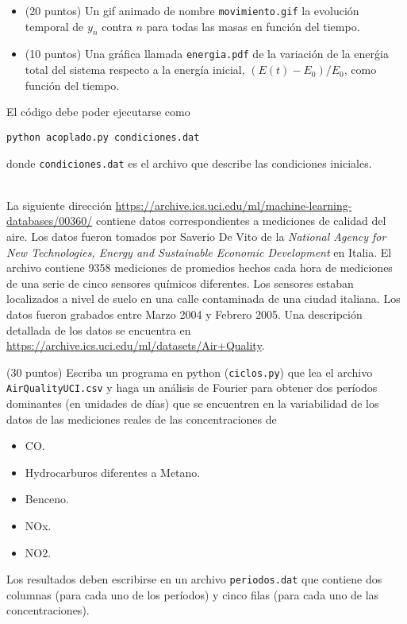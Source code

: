 \documentclass[11pt,letterpaper]{exam}
\begin{document}
\begin{questions}
\begin{itemize}
\item (20 puntos) Un gif animado de nombre \verb"movimiento.gif" la
  evoluci\'on temporal de $y_n$ contra $n$ para todas las masas en
  funci\'on del tiempo.
\item (10 puntos) Una gr\'afica llamada \verb"energia.pdf" de la
  variaci\'on de la ener\'gia total del sistema respecto a la
  energ\'ia inicial, $(E(t) - E_0)/E_0$, como funci\'on del
  tiempo. 
\end{itemize} 
El c\'odigo debe poder ejecutarse como 
\begin{verbatim}
python acoplado.py condiciones.dat
\end{verbatim}
%
donde \verb"condiciones.dat" es el archivo que describe las
condiciones iniciales.



 \\
La siguiente direcci\'on
\url{https://archive.ics.uci.edu/ml/machine-learning-databases/00360/}
contiene datos correspondientes a mediciones de calidad del aire.
Los datos fueron tomados por Saverio De Vito de la \emph{National Agency for
New Technologies, Energy and Sustainable Economic Development}  en Italia.
El archivo contiene 9358 mediciones de promedios hechos cada hora de
mediciones de una serie de cinco sensores qu\'imicos diferentes. Los
sensores estaban localizados a nivel de suelo en una calle contaminada de
una ciudad italiana. Los datos fueron grabados entre Marzo 2004 y Febrero 2005. 
Una descripci\'on detallada de los datos se encuentra en
\url{https://archive.ics.uci.edu/ml/datasets/Air+Quality}.

(30 puntos) Escriba un programa en python (\verb"ciclos.py") que lea
el archivo \verb"AirQualityUCI.csv" y haga un an\'alisis de Fourier
para obtener dos per\'iodos dominantes (en unidades de d\'ias) que se
encuentren en la variabilidad de los datos de las mediciones reales de
las concentraciones de  
\begin{itemize}
\item CO.
\item Hydrocarburos diferentes a Metano.
\item Benceno.
\item NOx.
\item NO2.
\end{itemize}

Los resultados deben escribirse en un archivo \verb"periodos.dat" que
contiene dos columnas (para cada uno de los per\'iodos) y cinco filas
(para cada uno de las concentraciones).  


\end{questions}
\end{document}
